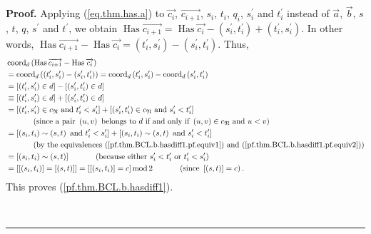 \documentclass
[numbers=enddot,12pt,final,onecolumn,notitlepage,abstracton]{scrartcl}%
\theoremstyle{definition}
\newenvironment{proof}[1][Proof]{\noindent\textbf{#1.} }{\ \rule{0.5em}{0.5em}}
\begin{document}
\begin{proof}
Applying (\ref{eq.thm.has.a}) to $\overrightarrow{c_{i}}$,
$\overrightarrow{c_{i+1}}$, $s_{i}$, $t_{i}$, $q_{i}$, $s_{i}^{\prime}$ and
$t_{i}^{\prime}$ instead of $\overrightarrow{a}$, $\overrightarrow{b}$, $s$,
$t$, $q$, $s^{\prime}$ and $t^{\prime}$, we obtain $\operatorname*{Has}%
\overrightarrow{c_{i+1}}=\operatorname*{Has}\overrightarrow{c_{i}}-\left(
s_{i}^{\prime},t_{i}^{\prime}\right)  +\left(  t_{i}^{\prime},s_{i}^{\prime
}\right)  $. In other words, $\operatorname*{Has}\overrightarrow{c_{i+1}%
}-\operatorname*{Has}\overrightarrow{c_{i}}=\left(  t_{i}^{\prime}%
,s_{i}^{\prime}\right)  -\left(  s_{i}^{\prime},t_{i}^{\prime}\right)  $.
Thus,%
\begin{align*}
&  \operatorname*{coord}\nolimits_{d}\left(  \operatorname*{Has}%
\overrightarrow{c_{i+1}}-\operatorname*{Has}\overrightarrow{c_{i}}\right) \\
&  =\operatorname*{coord}\nolimits_{d}\left(  \left(  t_{i}^{\prime}%
,s_{i}^{\prime}\right)  -\left(  s_{i}^{\prime},t_{i}^{\prime}\right)
\right)  =\operatorname*{coord}\nolimits_{d}\left(  t_{i}^{\prime}%
,s_{i}^{\prime}\right)  -\operatorname*{coord}\nolimits_{d}\left(
s_{i}^{\prime},t_{i}^{\prime}\right) \\
&  =\left[  \left(  t_{i}^{\prime},s_{i}^{\prime}\right)  \in d\right]
-\left[  \left(  s_{i}^{\prime},t_{i}^{\prime}\right)  \in d\right] \\
&  \equiv\left[  \left(  t_{i}^{\prime},s_{i}^{\prime}\right)  \in d\right]
+\left[  \left(  s_{i}^{\prime},t_{i}^{\prime}\right)  \in d\right] \\
&  =\left[  \left(  t_{i}^{\prime},s_{i}^{\prime}\right)  \in c_{\mathfrak{N}%
}\text{ and }t_{i}^{\prime}<s_{i}^{\prime}\right]  +\left[  \left(
s_{i}^{\prime},t_{i}^{\prime}\right)  \in c_{\mathfrak{N}}\text{ and }%
s_{i}^{\prime}<t_{i}^{\prime}\right] \\
&  \ \ \ \ \ \ \ \ \ \ \left(  \text{since a pair }\left(  u,v\right)  \text{
belongs to }d\text{ if and only if }\left(  u,v\right)  \in c_{\mathfrak{N}%
}\text{ and }u<v\right) \\
&  =\left[  \left(  s_{i},t_{i}\right)  \sim\left(  s,t\right)  \text{ and
}t_{i}^{\prime}<s_{i}^{\prime}\right]  +\left[  \left(  s_{i},t_{i}\right)
\sim\left(  s,t\right)  \text{ and }s_{i}^{\prime}<t_{i}^{\prime}\right] \\
&  \ \ \ \ \ \ \ \ \ \ \left(  \text{by the equivalences
(\ref{pf.thm.BCL.b.hasdiff1.pf.equiv1}) and
(\ref{pf.thm.BCL.b.hasdiff1.pf.equiv2})}\right) \\
&  =\left[  \left(  s_{i},t_{i}\right)  \sim\left(  s,t\right)  \right]
\ \ \ \ \ \ \ \ \ \ \left(  \text{because either }s_{i}^{\prime}<t_{i}%
^{\prime}\text{ or }t_{i}^{\prime}<s_{i}^{\prime}\right) \\
&  =\left[  \left[  \left(  s_{i},t_{i}\right)  \right]  =\left[  \left(
s,t\right)  \right]  \right]  =\left[  \left[  \left(  s_{i},t_{i}\right)
\right]  =c\right]  \operatorname{mod}2\ \ \ \ \ \ \ \ \ \ \left(  \text{since
}\left[  \left(  s,t\right)  \right]  =c\right)  .
\end{align*}
This proves (\ref{pf.thm.BCL.b.hasdiff1}).


\end{proof}
\end{document}
